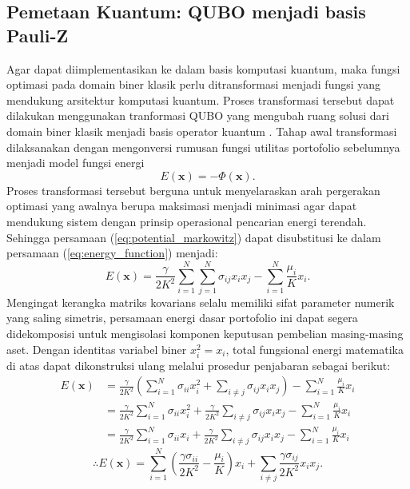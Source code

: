 \subsection{Pemetaan Kuantum: QUBO menjadi basis Pauli-Z}
Agar dapat diimplementasikan ke dalam basis komputasi kuantum, maka fungsi optimasi pada domain biner klasik perlu ditransformasi menjadi fungsi yang mendukung arsitektur komputasi kuantum. Proses transformasi tersebut dapat dilakukan menggunakan tranformasi QUBO yang mengubah ruang solusi dari domain biner klasik menjadi basis operator kuantum \cite{lucas_ising_2014}. Tahap awal transformasi dilaksanakan dengan mengonversi rumusan fungsi utilitas portofolio sebelumnya menjadi model fungsi energi 
\begin{equation}
    E(\mathbf{x}) = -\Phi(\mathbf{x}).
    \label{eq:energy_function}
\end{equation}    
Proses transformasi tersebut berguna untuk menyelaraskan arah pergerakan optimasi yang awalnya berupa maksimasi menjadi minimasi agar dapat mendukung sistem dengan prinsip operasional pencarian energi terendah. Sehingga persamaan (\ref{eq:potential_markowitz}) dapat disubstitusi ke dalam persamaan (\ref{eq:energy_function}) menjadi:
\begin{equation}
    E(\mathbf{x}) = \frac{\gamma}{2K^2}\sum_{i=1}^N\sum_{j=1}^N \sigma_{ij} x_i x_j - \sum_{i=1}^N \frac{\mu_i}{K} x_i.
    \label{eq:energy_function_markowitz}
\end{equation}
Mengingat kerangka matriks kovarians selalu memiliki sifat parameter numerik yang saling simetris, persamaan energi dasar portofolio ini dapat segera didekomposisi untuk mengisolasi komponen keputusan pembelian masing-masing aset. Dengan identitas variabel biner $x_i^2 = x_i$, total fungsional energi matematika di atas dapat dikonstruksi ulang melalui prosedur penjabaran sebagai berikut:
\begin{equation*}
    \begin{split}
    E(\mathbf{x}) &= \frac{\gamma}{2K^2}\left(\sum_{i=1}^N\sigma_{ii} x_i^2 + \sum_{i\ne j}\sigma_{ij} x_ix_j\right) -\sum_{i=1}^N \frac{\mu_i}{K} x_i \\
    &= \frac{\gamma}{2K^2}\sum_{i=1}^N\sigma_{ii} x_i^2 + \frac{\gamma}{2K^2}\sum_{i\ne j}\sigma_{ij} x_ix_j - \sum_{i=1}^N \frac{\mu_i}{K} x_i \\
    &= \frac{\gamma}{2K^2}\sum_{i=1}^N\sigma_{ii} x_i + \frac{\gamma}{2K^2}\sum_{i\ne j}\sigma_{ij} x_ix_j - \sum_{i=1}^N \frac{\mu_i}{K} x_i
    \end{split}
\end{equation*}
\begin{equation}
    \therefore E(\mathbf{x}) = \sum_{i=1}^N\left(\frac{\gamma \sigma_{ii}}{2K^2} - \frac{\mu_i}{K}\right)x_i + \sum_{i\ne j}\frac{\gamma \sigma_{ij}}{2K^2} x_ix_j.
\end{equation}

